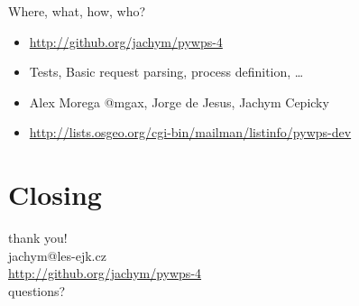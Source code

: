 \documentclass[xcolor=dvipsnames]{beamer}
\begin{document}
\begin{frame}{Where, what, how, who?}
    \begin{itemize}
        \item \url{http://github.org/jachym/pywps-4}
            \pause
        \item Tests, Basic request parsing, process definition, \dots
            \pause
        \item Alex Morega @mgax, Jorge de Jesus, Jachym Cepicky
            \pause
        \item \url{http://lists.osgeo.org/cgi-bin/mailman/listinfo/pywps-dev}
    \end{itemize}
\end{frame}

\section*{Closing}
\begin{frame}
    \begin{center}
        thank you!\\
        jachym@les-ejk.cz\\
        \url{http://github.org/jachym/pywps-4}\\
        \bigskip
        questions?
    \end{center}
\end{frame}
    
\end{document}

